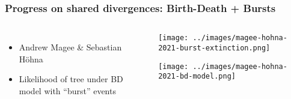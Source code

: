 \begin{frame}[t]
    \frametitle{Progress on shared divergences: Birth-Death + Bursts}

    \begin{columns}

        \begin{minipage}[c][\frametextheight][c]{\columnwidth}
            \begin{itemize}
                \item Andrew Magee \& Sebastian H\"{o}hna
                \item Likelihood of tree under BD model with ``burst'' events
            \end{itemize}
        \end{minipage}


        \begin{minipage}[c][\frametextheight][t]{\columnwidth}
            \begin{center}
                \texttt{[image: ../images/magee-hohna-2021-burst-extinction.png]}

                \smallskip
                \texttt{[image: ../images/magee-hohna-2021-bd-model.png]}
            \end{center}
        \end{minipage}

    \end{columns}

\end{frame}
